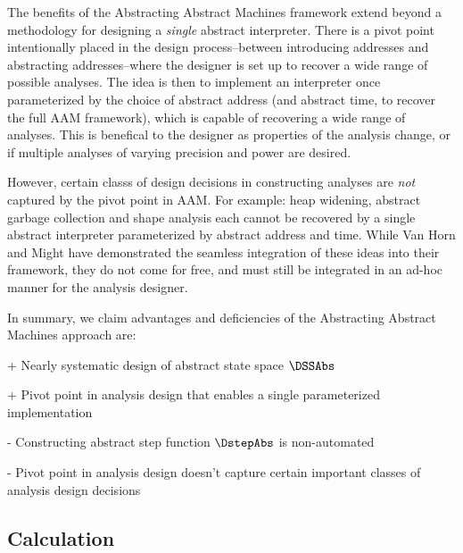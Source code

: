 
The benefits of the Abstracting Abstract Machines framework extend beyond a
methodology for designing a \textit{single} abstract interpreter.
%
There is a pivot point intentionally placed in the design process--between
introducing addresses and abstracting addresses--where the designer is set up
to recover a wide range of possible analyses.
%
The idea is then to implement an interpreter once parameterized by the choice
of abstract address (and abstract time, to recover the full AAM framework),
which is capable of recovering a wide range of analyses.
%
This is benefical to the designer as properties of the analysis change, or if
multiple analyses of varying precision and power are desired.


However, certain classs of design decisions in constructing analyses are
\textit{not} captured by the pivot point in AAM.
%
For example: heap widening, abstract garbage collection and shape analysis each
cannot be recovered by a single abstract interpreter parameterized by abstract
address and time.
%
While Van Horn and Might have demonstrated the seamless integration of these
ideas into their framework, they do not come for free, and must still be
integrated in an ad-hoc manner for the analysis designer.


In summary, we claim advantages and deficiencies of the Abstracting Abstract
Machines approach are:
\begin{itemizenobreak}
\item + Nearly systematic design of abstract state space $\DSSAbs$
\item + Pivot point in analysis design that enables a single parameterized implementation
\item - Constructing abstract step function $\DstepAbs$ is non-automated
\item - Pivot point in analysis design doesn't capture certain important
        classes of analysis design decisions
\end{itemizenobreak}


\subsection{Calculation}

